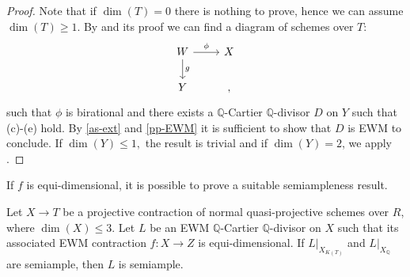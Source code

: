 \begin{proof}
	Note that if $\dim(T)=0$ there is nothing to prove, hence we can assume $\dim(T)\geq 1$. By \cite[Lemma 9.24]{bhatt2020} and its proof we can find a diagram of schemes over $T$:
	\[
	\begin{tikzcd}
	W \arrow[d, "g"] \arrow[r, "\phi"] & X  \\
	Y           &      ,
	\end{tikzcd}
	\]
	such that $\phi$ is birational and there exists a $\mathbb{Q}$-Cartier $\mathbb{Q}$-divisor $D$ on $Y$ such that (c)-(e) hold.
	By \autoref{as-ext} and \autoref{pp-EWM} it is sufficient to show that $D$ is EWM to conclude. If $\dim(Y) \leq 1,$ the result is trivial and if $\dim(Y)=2$, we apply \cite[Lemma 2.48]{bhatt2020}.
\end{proof}	

If $f$ is equi-dimensional, it is possible to prove a suitable semiampleness result.

\begin{proposition}\label{EDsemiampleness2}
	Let $X \to T$ be a projective contraction of normal quasi-projective schemes over $R$, where $\dim(X) \leq 3$.
	Let $L$ be an EWM $\mathbb{Q}$-Cartier $\mathbb{Q}$-divisor on $X$ such that its associated EWM contraction $f \colon X \to Z$ is equi-dimensional.
	If $L|_{X_{K(T)}}$ and $L|_{X_{\mathbb{Q}}}$ are semiample, then $L$ is semiample.
\end{proposition}

